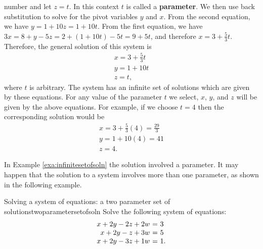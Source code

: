 \begin{solution}
  number and let $z = t$.  In this context $t$ is called a
  \textbf{parameter}. We then use back substitution
  to solve for the pivot variables $y$ and $x$. From the second
  equation, we have $y = 1+10z = 1+10t$. From the first equation, we
  have $3x = 8+y-5z = 2+(1+10t)-5t = 9+5t$, and therefore
  $x=3+\frac{5}{3}t$. Therefore, the general solution of this system
  is
  \[
    \begin{array}{l}
      x=3+\frac{5}{3}t \\
      y=1+10t \\
      z=t,
    \end{array}
  \]
  where $t$ is arbitrary. The system has an infinite set of solutions
  which are given by these equations. For any value of the parameter
  $t$ we select, $x$, $y$, and $z$ will be given by the above
  equations. For example, if we choose $t=4$ then the corresponding
  solution would be
  \[
    \begin{array}{l}
      x = 3 + \frac{5}{3}(4) = \frac{29}{3}\\
      y = 1+10(4) = 41 \\
      z = 4.
    \end{array}
  \]
\end{solution}

In Example \ref{exa:infinitesetofsoln} the solution involved a
parameter. It may happen that the solution to a system involves more
than one parameter, as shown in the following example.

\begin{example}{Solving a system of equations: a two parameter set of solutions}{twoparametersetofsoln}
  Solve the following system of equations:
  \begin{equation*}
    \begin{array}{r@{~}c@{~}l}
      x +2y  -2z  +2w &=& 3 \\
      x +2y  -z   +3w &=& 5 \\
      x +2y  -3z  +1w &=& 1.
    \end{array}
  \end{equation*}
\end{example}

